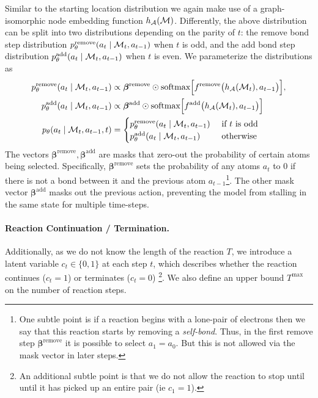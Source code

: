 Similar to the starting location distribution we again make use of a graph-isomorphic node embedding function $h_{{\mathcal{A}}}({\mathcal{M}})$. Differently, the above distribution can be split into two distributions depending on the parity of $t$:
the remove bond step distribution $p_\theta^\textrm{remove}(a_t \mid  {\mathcal{M}}_t, a_{t-1})$ when $t$ is odd, 
and the add bond step distribution $p_\theta^\textrm{add}(a_t \mid {\mathcal{M}}_t, a_{t-1})$ when $t$ is even. We parameterize the distributions as
\begin{align}
p_\theta^\textrm{remove}(a_t \mid  {\mathcal{M}}_t, a_{t-1}) &\propto \bm{\beta}^\textrm{remove} \odot \mbox{softmax}\Big[f^\textrm{remove}\big(h_{{\mathcal{A}}}({\mathcal{M}}_t), a_{t-1}\big)\Big], \\
p_\theta^\textrm{add}(a_t \mid {\mathcal{M}}_t, a_{t-1}) &\propto \bm{\beta}^\textrm{add} \odot \mbox{softmax}\Big[f^\textrm{add}\big(h_{{\mathcal{A}}}({\mathcal{M}}_t), a_{t-1}\big)\Big] \\
p_\theta(a_t \mid {\mathcal{M}}_{t}, a_{t-1}, t) &= 
\begin{cases}
p_\theta^\textrm{remove}(a_t \mid  {\mathcal{M}}_t, a_{t-1}) & \mbox{ if } t \mbox{ is odd} \\
p_\theta^\textrm{add}(a_t \mid {\mathcal{M}}_t, a_{t-1}) & \mbox{ otherwise }
\end{cases}
\end{align}
The vectors $\bm{\beta}^\textrm{remove},\bm{\beta}^\textrm{add}$ are masks that zero-out the probability of certain atoms being selected. Specifically, $\bm{\beta}^\mathrm{remove}$ sets the probability of any atoms $a_t$ to 0 if there is not a bond between it and the previous atom $a_{t-1}$\footnote{One subtle point is if a reaction begins with a lone-pair of electrons then we say that this reaction starts by removing a \emph{self-bond}. Thus, in the first remove step $\bm{\beta}^\mathrm{remove}$ it is possible to select $a_1 \!=\! a_0$. But this is not allowed via the mask vector in later steps.}. The other mask vector $\bm{\beta}^\textrm{add}$ masks out the previous action, preventing the model from stalling in the same state for multiple time-steps. %







\paragraph{Reaction Continuation / Termination.}
Additionally, as we do not know the length of the reaction $T$, we introduce a latent variable $c_t \in \{0, 1\}$ at each step $t$, which describes whether the reaction continues ($c_t\!=\!1$) or terminates ($c_t\!=\!0$) \footnote{An additional subtle point is that we do not allow the reaction to stop until until it has picked up an entire pair (ie $c_1=1$).}.
We also define an upper bound  $T^{\mathrm{max}}$ on the number of reaction steps. 

